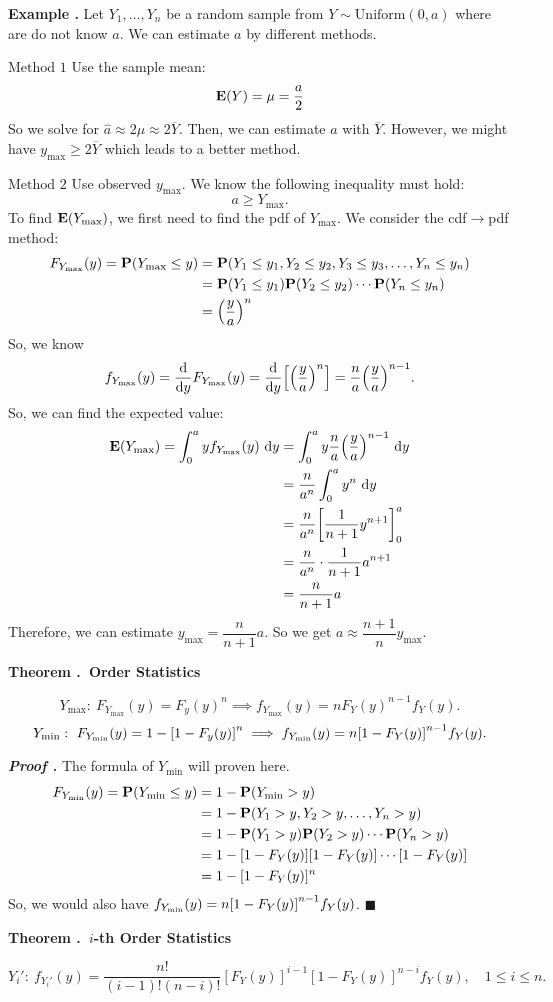 \documentclass[12pt, a4paper]{article}
\newcounter{index}[subsection]
\newenvironment*{eg}{\begin{framed}\par\noindent\textbf{Example \thesubsection.\stepcounter{index}\theindex}}{\par\end{framed}}
\newenvironment*{thm}[1]{\begin{tcolorbox}\par\noindent\textbf{Theorem \thesubsection.\stepcounter{index}\theindex\ #1} \par}{\par\end{tcolorbox}}
\newcounter{nprf}[subsection]
\newenvironment*{prf}{\par\indent\textbf{\textit{Proof \stepcounter{nprf}\thenprf.}}}{\hfill$\blacksquare$\par}
\def\d{\mathrm{d}}
\def\dsst{\displaystyle}
\def\bar{\overline}
\def\E{\vb{E}}
\def\P{\vb{P}}
\begin{document}
\begin{eg}
	Let $Y_1,\dots,Y_n$ be a random sample from $Y\sim\text{Uniform}(0,a)$ where are do not know $a$. We can estimate $a$ by different methods. \par 
	$\boxed{\text{Method }1}$ Use the sample mean: \[\E(Y)=\mu=\dfrac{a}{2}\] So we solve for $\hat{a}\approx2\mu\approx2\overline{Y}$. Then, we can estimate $a$ with $\bar{Y}$. However, we might have $y_\text{max}\geq2\bar{Y}$ which leads to a better method.\par 
	$\boxed{\text{Method }2}$ Use observed $y_\text{max}$. We know the following inequality must hold: \[a\geq Y_\text{max}.\] To find $\E(Y_\text{max})$, we first need to find the pdf of $Y_\text{max}$. We consider the cdf$\to$pdf method: \begin{align*}F_{Y_\text{max}}(y)=\P\qty(Y_\text{max}\leq y)&=\P\qty(Y_1\leq y_1, Y_2\leq y_2, Y_3\leq y_3,\dots,Y_n\leq y_n)\\&=\P(Y_1\leq y_1)\P(Y_2\leq y_2)\cdots \P(Y_n\leq y_n)\\&=\qty(\dfrac{y}{a})^n\end{align*} So, we know \[f_{Y_\text{max}}(y)=\dv{y}F_{Y_\text{max}}(y)=\dv{y}\qty[\qty(\dfrac{y}{a})^n]=\dfrac{n}{a}\qty(\dfrac{y}{a})^{n-1}.\] So, we can find the expected value: \begin{align*}\E(Y_\text{max})=\int_0^ayf_{Y_\text{max}}(y)\ \d{y}&=\int_0^ay\dfrac{n}{a}\qty(\dfrac{y}{a})^{n-1}\ \d{y}\\&=\dfrac{n}{a^n}\int_0^ay^n\ \d{y}\\&=\dfrac{n}{a^n}\qty[\dfrac{1}{n+1}y^{n+1}]_0^a\\&=\dfrac{n}{a^n}\cdot\dfrac{1}{n+1}a^{n+1}\\&=\dfrac{n}{n+1}a\end{align*}Therefore, we can estimate $y_\text{max}=\dsst\dfrac{n}{n+1}a$. So we get $a\approx\dfrac{n+1}{n}y_\text{max}.$
\end{eg}
\begin{thm}{Order Statistics}
	\[Y_\text{max}:\ F_{Y_\text{max}}(y)=F_y(y)^n\implies f_{Y_\text{max}}(y)=nF_Y(y)^{n-1}f_Y(y).\] \[Y_\text{min}:\ F_{Y_\text{min}}(y)=1-\qty[1-F_y(y)]^n\implies f_{Y_\text{min}}(y)=n\qty[1-F_Y(y)]^{n-1}f_Y(y).\]
\end{thm}
\begin{prf}
	The formula of $Y_\text{min}$ will proven here. \begin{align*}F_{Y_\text{min}}(y)=\P(Y_\text{min}\leq y)&=1-\P(Y_\text{min}>y)\\&=1-\P(Y_1>y,Y_2>y,\dots,Y_n>y)\\&=1-\P(Y_1>y)\P(Y_2>y)\cdots \P(Y_n>y)\\&=1-[1-F_Y(y)][1-F_Y(y)]\cdots[1-F_Y(y)]\\&=1-[1-F_Y(y)]^n\end{align*} So, we would also have $f_{Y_\text{min}}(y)=n\qty[1-F_Y(y)]^{n-1}f_Y(y)$.
\end{prf}
\begin{thm}{$i$-th Order Statistics}
	\[Y_i':\ f_{Y_i'}(y)=\dfrac{n!}{(i-1)!(n-i)!}[F_Y(y)]^{i-1}[1-F_Y(y)]^{n-i}f_Y(y),\quad1\leq i\leq n.\]
\end{thm}
\end{document}
